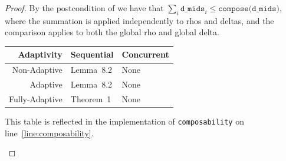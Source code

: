 \documentclass{article}
\begin{document}
\begin{proof}
  By the postcondition of  we have that $\sum_i \texttt{d\_mids}_i \le \texttt{compose(d\_mids)}$,
  where the summation is applied independently to rhos and deltas, and the comparison applies to both the global rho and global delta.

  \begin{center}
    \begin{tabular}{ r | l l }
      Adaptivity & Sequential & Concurrent \\
      \hline
      Non-Adaptive & Lemma~8.2\cite{bun2016concentrated} & None \\
      Adaptive & Lemma~8.2\cite{bun2016concentrated} & None \\
      Fully-Adaptive & Theorem~1\cite{whitehouse2023fullyadaptive} & None
    \end{tabular}

    This table is reflected in the implementation of \texttt{composability} on line~\ref{line:composability}.
  \end{center}

\end{proof}



\end{document}
